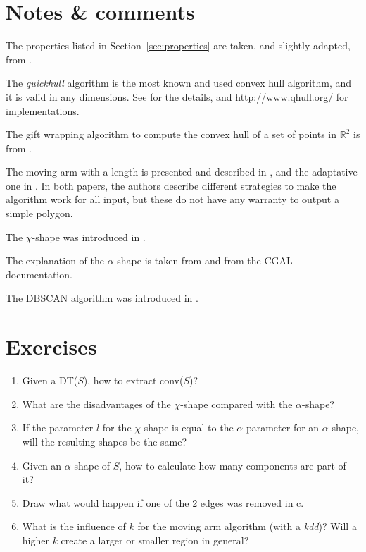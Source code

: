 %





%
\section{Notes \& comments}

The properties listed in Section~\ref{sec:properties} are taken, and slightly adapted, from \citet{Galton06}. 

The \emph{quickhull} algorithm is the most known and used convex hull algorithm, and it is valid in any dimensions. See \citet{Barber96} for the details, and \url{http://www.qhull.org/} for implementations.

The gift wrapping algorithm to compute the convex hull of a set of points in $\mathbb{R}^2$ is from \citet{Jarvis73}.

The moving arm with a length is presented and described in \citet{Galton06}, and the adaptative one in \citet{Moreira07}.
In both papers, the authors describe different strategies to make the algorithm work for all input, but these do not have any warranty to output a simple polygon.

The $\chi$-shape was introduced in \citet{Duckham08}.

The explanation of the $\alpha$-shape is taken from \citet{Edelsbrunner94} and from the CGAL documentation.

The DBSCAN algorithm was introduced in \citet{Ester96}.


%
\section{Exercises}

\begin{enumerate}
  \item Given a DT($S$), how to extract conv($S$)?
  \item What are the disadvantages of the $\chi$-shape compared with the $\alpha$-shape?
  \item If the parameter $l$ for the $\chi$-shape is equal to the $\alpha$ parameter for an $\alpha$-shape, will the resulting shapes be the same?
  \item Given an $\alpha$-shape of $S$, how to calculate how many components are part of it? 
  \item Draw what would happen if one of the 2 edges was removed in c.
  \item What is the influence of $k$ for the moving arm algorithm (with a \emph{kdd})? Will a higher $k$ create a larger or smaller region in general?
\end{enumerate}
